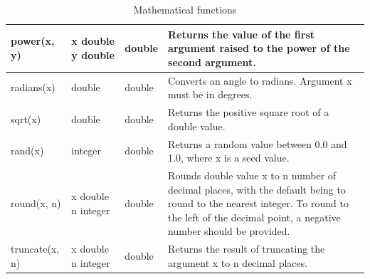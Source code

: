 \documentclass[11pt,a4paper]{ivoa}
\begin{document}
\begin{table}[thm]
\begin{tabular}{|p{}|p{}|p{}|p{}|}
        \hline
        power(x, y) &
        x double \newline y double &
        double &
        Returns the value of the first argument raised to the power of the second argument.\\

        \hline
        radians(x) &
        double &
        double &
        Converts an angle to radians. Argument x must be in degrees.\\

        \hline
        sqrt(x) &
        double &
        double &
        Returns the positive square root of a double value.\\

        \hline
        rand(x) &
        integer &
        double &
        Returns a random value between 0.0 and 1.0, where x is a seed  value.\\

        \hline
        round(x, n) &
        x double \newline n integer &
        double &
        Rounds double value x to n number of decimal places, with the default being to round to the nearest integer.
        To round to the left of the decimal point, a negative number should be provided.\\

        \hline
        truncate(x, n) &
        x double \newline n integer &
        double &
        Returns the result of truncating the argument x to n decimal places.\\

        \hline
    \end{tabular}
    \caption{Mathematical functions}
    \label{table:extable}
\end{table}
\end{document}
